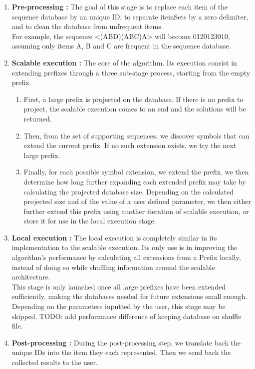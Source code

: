 \documentclass{eplmastersthesis}
\begin{document}
\begin{enumerate}
\item \textbf{Pre-processing :} The goal of this stage is to replace each item of the sequence database by an unique ID, to separate itemSets by a zero delimiter, and to clean the database from unfrequent items. \\
For example, the sequence <(ABD)(ABC)A> will become 0120123010, assuming only items A, B and C are frequent in the sequence database.
\item \textbf{Scalable execution :} The core of the algorithm. Its execution consist in extending prefixes through a three sub-stage process, starting from the empty prefix.
	\begin{enumerate}
	\item First, a large prefix is projected on the database. If there is no prefix to project, the scalable execution comes to an end and the solutions will be returned.
	\item Then, from the set of supporting sequences, we discover symbols that can extend the current prefix. If no such extension exists, we try the next large prefix.
	\item Finally, for each possible symbol extension, we extend the prefix. we then determine how long further expanding each extended prefix may take by calculating the projected database size. Depending on the calculated projected size and of the value of a user defined parameter, we then either further extend this prefix using another iteration of scalable execution, or store it for use in the local execution stage. 
	\end{enumerate}
\item \textbf{Local execution :} The local execution is completely similar in its implementation to the scalable execution. Its only use is in improving the algorithm's performance by calculating all extensions from a Prefix locally, instead of doing so while shuffling information around the scalable architecture. \\
This stage is only launched once all large prefixes have been extended sufficiently, making the databases needed for future extensions small enough. Depending on the parameters inputted by the user, this stage may be skipped. TODO: add performance difference of keeping database on shuffle file.
\item \textbf{Post-processing :} During the post-processing step, we translate back the unique IDs into the item they each represented. Then we send back the collected results to the user.
\end{enumerate}
\end{document}

